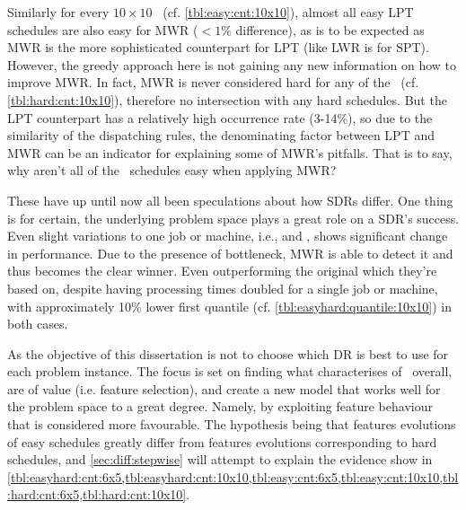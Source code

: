 Similarly for every $10\times10$ \JSP\ (cf. \cref{tbl:easy:cnt:10x10}), almost all easy LPT schedules are also easy  for MWR ($<1\%$ difference), as is to be expected as MWR is the more sophisticated counterpart for LPT (like LWR is for SPT). 
However, the greedy approach here is  not gaining any new information on how to improve MWR. 
In fact, MWR is never considered hard for any of the \JSP\ (cf. \cref{tbl:hard:cnt:10x10}), therefore no intersection with any hard schedules. 
But the LPT counterpart has a relatively high occurrence rate (3-14\%), so due to the similarity of the dispatching rules, the denominating factor between LPT and MWR can be an indicator for explaining some of MWR's pitfalls.
That is to say, why aren't all of the \jsp\ schedules easy when applying MWR? 

\clearpage
These have up until now all been speculations about how SDRs differ. One thing is for certain, the underlying problem space plays a great role on a SDR's success. Even slight variations to one job or machine, i.e.,  and , shows significant change in performance. Due to the presence of bottleneck, MWR is able to detect it and thus becomes the clear winner. Even outperforming the original  which they're based on, despite having processing times doubled for a single job or machine, with approximately 10\% lower first quantile (cf. \cref{tbl:easyhard:quantile:10x10}) in both cases. 

As the objective of this dissertation is not to choose which DR is best to use for each problem instance. 
The focus is set on finding what characterises of \jsp\ overall, are of value (i.e. feature selection), and create a new model that works well for the problem space to a great degree.
Namely, by exploiting feature behaviour that is considered more favourable. The hypothesis being that features evolutions of easy schedules greatly differ from features evolutions corresponding to hard schedules, and \cref{sec:diff:stepwise} will attempt to explain the evidence show in \cref{tbl:easyhard:cnt:6x5,tbl:easyhard:cnt:10x10,tbl:easy:cnt:6x5,tbl:easy:cnt:10x10,tbl:hard:cnt:6x5,tbl:hard:cnt:10x10}.

